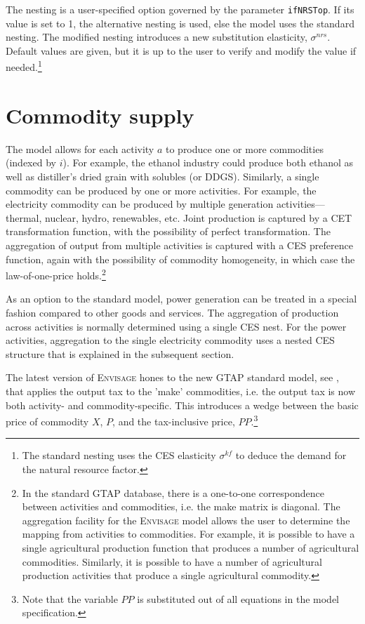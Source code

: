 \documentclass[11pt,letterpaper]{report}
\begin{document}
The nesting is a user-specified option governed by the
parameter \texttt{ifNRSTop}. If its value is set to 1, the
alternative nesting is used, else the model uses the
standard nesting. The modified nesting introduces a new
substitution elasticity, $\sigma^{\mathit{nrs}}$. Default
values are given, but it is up to the user to verify and
modify the value if needed.\footnote{The standard nesting
uses the CES elasticity $\sigma^{\mathit{kf}}$ to deduce
the demand for the natural resource factor.}

\section{Commodity supply}
\renewcommand{\theequation}{{S-}\arabic{equation}}
\setcounter{equation}{0}

The model allows for each activity $a$ to produce one or more commodities
(indexed by $i$). For example, the ethanol industry could produce both ethanol
as well as distiller's dried grain with solubles (or DDGS). Similarly, a single
commodity can be produced by one or more activities. For example, the
electricity commodity can be produced by multiple generation
activities---thermal, nuclear, hydro, renewables, etc. Joint production is
captured by a CET transformation function, with the possibility of perfect
transformation. The aggregation of output from multiple activities is captured
with a CES preference function, again with the possibility of commodity
homogeneity, in which case the law-of-one-price holds.\footnote{In the standard
GTAP database, there is a one-to-one correspondence between activities and
commodities, i.e. the make matrix is diagonal. The aggregation facility for the
\textsc{Envisage} model allows the user to determine the mapping from activities
to commodities. For example, it is possible to have a single agricultural
production function that produces a number of agricultural commodities.
Similarly, it is possible to have a number of agricultural production activities
that produce a single agricultural commodity.}

As an option to the standard model, power generation can be treated in a special
fashion compared to other goods and services. The aggregation of production
across activities is normally determined using a single CES nest. For the power
activities, aggregation to the single electricity commodity uses a nested CES
structure that is explained in the subsequent section.

The latest version of \textsc{Envisage} hones to the new GTAP standard model,
see \cite{CorongGEA2017}, that applies the output tax to the 'make' commodities,
i.e. the output tax is now both activity- and commodity-specific. This
introduces a wedge between the basic price of commodity $X$, $P$, and the
tax-inclusive price, $\mathit{PP}$.\footnote{Note that the variable
$\mathit{PP}$ is substituted out of all equations in the model specification.}
\end{document}
